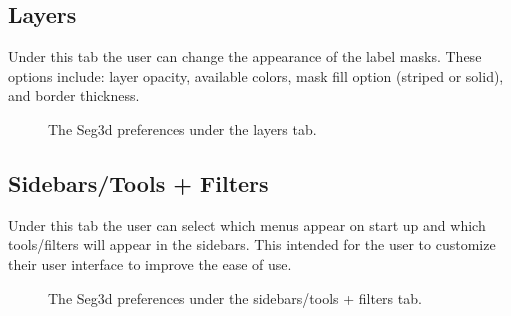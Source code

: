 \documentclass[fleqn,11pt,openany]{book}
\begin{document}
\newpage

\subsection{Layers}
Under this tab the user can change the appearance of the label masks. These options include: layer opacity, available colors, mask fill option (striped or solid), and border thickness.

\begin{figure}[h!]
\caption{The Seg3d preferences under the layers tab.}\label{fig:Pref_layers}
\end{figure}


\subsection{Sidebars/Tools + Filters}
Under this tab the user can select which menus appear on start up and which tools/filters will appear in the 
sidebars.  This intended for the user to customize their user interface to improve the ease of use.

\begin{figure}[h!]
\caption{The Seg3d preferences under the sidebars/tools + filters tab.}\label{fig:Pref_side}
\end{figure}
\end{document}
